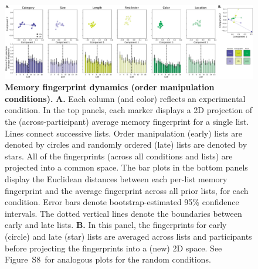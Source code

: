 \documentclass[11pt]{article}
\newcommand{\fingerprintTrajectoryRandom}{S8}
\begin{document}
\begin{figure}[tp] \centering
    \includegraphics[width=\textwidth]{figures/fingerprint_trajectories}

    \caption{\textbf{Memory fingerprint dynamics (order manipulation
    conditions).} \textbf{A.} Each column (and color) reflects an experimental
    condition. In the top panels, each marker displays a 2D projection of the
    (across-participant) average memory fingerprint for a single list. Lines
    connect successive lists. Order manipulation (early) lists are denoted by
    circles and randomly ordered (late) lists are denoted by stars. All of the
    fingerprints (across all conditions and lists) are projected into a common
    space. The bar plots in the bottom panels display the Euclidean distances
    between each per-list memory fingerprint and the average fingerprint across
    all prior lists, for each condition. Error bars denote bootstrap-estimated
    95\% confidence intervals. The dotted vertical lines denote the boundaries
    between early and late lists. \textbf{B.} In this panel, the fingerprints
    for early (circle) and late (star) lists are averaged across lists and
    participants before projecting the fingerprints into a (new) 2D space. See
    Figure~\fingerprintTrajectoryRandom~for analogous plots for the random
    conditions. } \label{fig:fingerprint-trajectories}

    \end{figure}
\end{document}
